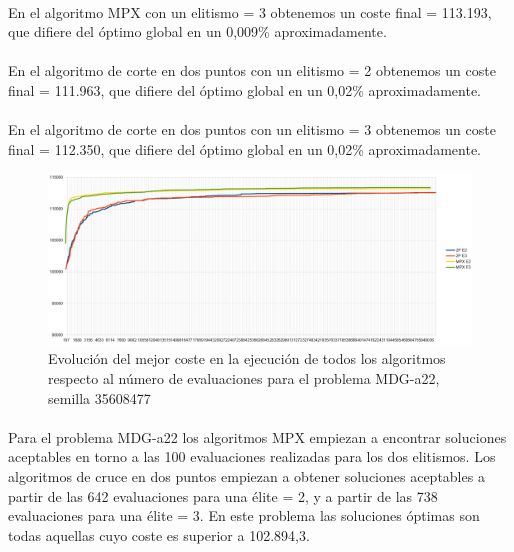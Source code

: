 	\paragraph{}En el algoritmo MPX con un elitismo = 3 obtenemos un coste final = 113.193, que difiere del óptimo global en un 0,009\% aproximadamente.
	
	\paragraph{}En el algoritmo de corte en dos puntos con un elitismo = 2 obtenemos un coste final = 111.963, que difiere del óptimo global en un 0,02\% aproximadamente.
	
	\paragraph{}En el algoritmo de corte en dos puntos con un elitismo = 3 obtenemos un coste final = 112.350, que difiere del óptimo global en un 0,02\% aproximadamente.
	
	\begin{figure}[H]
		\centering
		\includegraphics[scale=0.3]{img/35608477_MDG-a_22_n2000_m200.png}
		\caption{Evolución del mejor coste en la ejecución de todos los algoritmos respecto al número de evaluaciones para el problema MDG-a22, semilla 35608477}
		\label{MDG-a_22_historico}
	\end{figure}

	\paragraph{}Para el problema MDG-a22 los algoritmos MPX empiezan a encontrar soluciones aceptables en torno a las 100 evaluaciones realizadas para los dos elitismos. Los algoritmos de cruce en dos puntos empiezan a obtener soluciones aceptables a partir de las 642 evaluaciones para una élite = 2, y a partir de las 738 evaluaciones para una élite = 3. En este problema las soluciones óptimas son todas aquellas cuyo coste es superior a 102.894,3.
	
